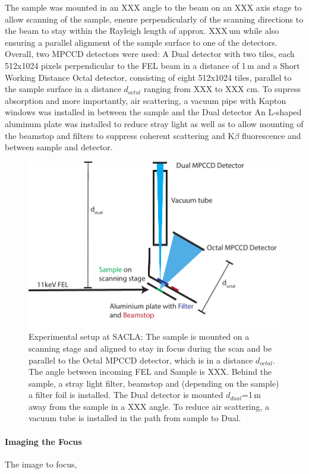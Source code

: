 The sample was mounted in an XXX angle to the beam on an XXX axis stage to allow scanning of the sample, ensure perpendicularly of the scanning directions to the beam to stay within the Rayleigh length of approx. XXX\,um while also ensuring a parallel alignment of the sample surface to one of the detectors. Overall, two MPCCD detectors were used: A Dual detector with two tiles, each 512x1024 pixels perpendicular to the FEL beam in a distance of 1\,m and a Short Working Distance Octal detector, consisting of eight 512x1024 tiles, parallel to the sample surface in a distance $d_{octal}$ ranging from XXX to XXX cm. To supress absorption and more importantly, air scattering, a vacuum pipe with Kapton windows was installed in between the sample and the Dual detector
An L-shaped aluminum plate was installed to reduce stray light as well as to allow mounting of the beamstop and filters to suppress coherent scattering and K$\beta$ fluorescence and between sample and detector.
\begin{figure}
	\centering
	\includegraphics[width=0.8\linewidth]{images/setup.pdf}
	\caption[Experimental setup at SACLA]{Experimental setup at SACLA: The sample is mounted on a scanning stage and aligned to stay in focus during the scan and be parallel to the Octal MPCCD detector, which is in a distance $d_{octal}$. The angle between incoming FEL and Sample is XXX. Behind the sample, a stray light filter, beamstop and (depending on the sample) a filter foil is installed. The Dual detector is mounted $d_{dual}$=1\,m away from the sample in a XXX angle. To reduce air scattering, a vacuum tube is installed in the path from sample to Dual.}
	\label{fig:setup}
\end{figure}
\paragraph{Imaging the Focus}
The image to focus, 
